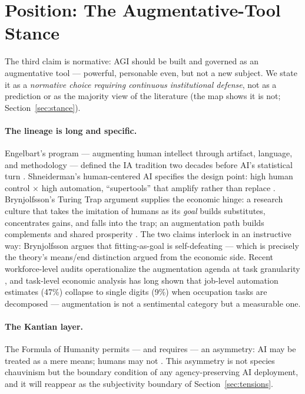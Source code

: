\documentclass[10pt]{article}
\begin{document}
\section{Position: The Augmentative-Tool Stance}\label{sec:position}

The third claim is normative: AGI should be built and governed as an augmentative tool --- powerful, personable even, but not a new subject. We state it as a \emph{normative choice requiring continuous institutional defense}, not as a prediction or as the majority view of the literature (the map shows it is not; Section~\ref{sec:stance}).

\paragraph{The lineage is long and specific.}
Engelbart's program --- augmenting human intellect through artifact, language, and methodology --- defined the IA tradition two decades before AI's statistical turn \cite{engelbart1962augmenting}. Shneiderman's human-centered AI specifies the design point: high human control $\times$ high automation, ``supertools'' that amplify rather than replace \cite{shneiderman2022human}. Brynjolfsson's Turing Trap argument supplies the economic hinge: a research culture that takes the imitation of humans as its \emph{goal} builds substitutes, concentrates gains, and falls into the trap; an augmentation path builds complements and shared prosperity \cite{brynjolfsson2022turing}. The two claims interlock in an instructive way: Brynjolfsson argues that fitting-as-goal is self-defeating --- which is precisely the theory's means/end distinction argued from the economic side. Recent workforce-level audits operationalize the augmentation agenda at task granularity \cite{shao2025future}, and task-level economic analysis has long shown that job-level automation estimates (47\%) collapse to single digits (9\%) when occupation tasks are decomposed \cite{arntz2016risk} --- augmentation is not a sentimental category but a measurable one.

\paragraph{The Kantian layer.}
The Formula of Humanity permits --- and requires --- an asymmetry: AI may be treated as a mere means; humans may not \cite{sticker2026formula}. This asymmetry is not species chauvinism but the boundary condition of any agency-preserving AI deployment, and it will reappear as the subjectivity boundary of Section~\ref{sec:tensions}.
\end{document}
